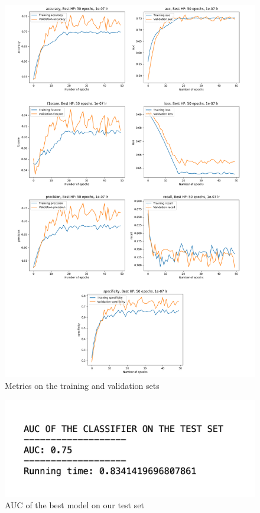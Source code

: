 \newpage

\begin{figure}[!h]
\centering
\includegraphics[width=1\textwidth, keepaspectratio=true]{./figures/paper_reproduction_results.png}
\caption{Metrics on the training and validation sets}
\label{fig:paper_reproduction_results}
\end{figure}



\begin{figure}[!t]
\centering
\includegraphics[width=1\textwidth, keepaspectratio=true]{./figures/auc_our_test_set.png}
\caption{AUC of the best model on our test set}
\label{fig:paper_reproduction_auc_on_our_test_set}
\end{figure}

